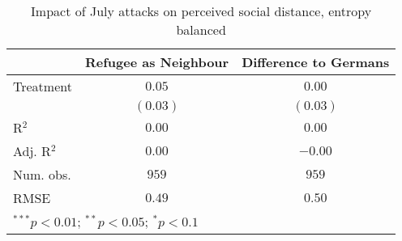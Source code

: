 
\begin{table}
\caption{Impact of July attacks on perceived social distance, entropy balanced}
\begin{center}
\begin{tabular}{l c c}
\toprule
 & Refugee as Neighbour & Difference to Germans \\
\midrule
Treatment  & $0.05$   & $0.00$   \\
           & $(0.03)$ & $(0.03)$ \\
\midrule
R$^2$      & $0.00$   & $0.00$   \\
Adj. R$^2$ & $0.00$   & $-0.00$  \\
Num. obs.  & $959$    & $959$    \\
RMSE       & $0.49$   & $0.50$   \\
\bottomrule
\multicolumn{3}{l}{\scriptsize{$^{***}p<0.01$; $^{**}p<0.05$; $^{*}p<0.1$}}
\end{tabular}
\label{tab_dist_match}
\end{center}
\end{table}
